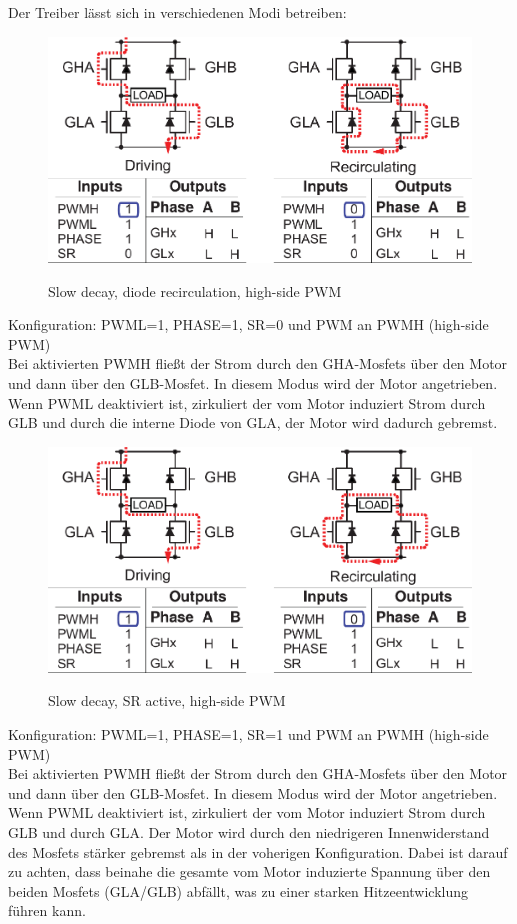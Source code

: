 Der Treiber lässt sich in verschiedenen Modi betreiben:

\begin{figure}[H]
\centering
\includegraphics[width=.8\textwidth]{3941_1.png}\\
\caption{Slow decay, diode recirculation, high-side PWM \cite{ds-A3941}}%
\label{fig:39411}
\end{figure}

Konfiguration: PWML=1, PHASE=1, SR=0 und PWM an PWMH (high-side PWM)\\
Bei aktivierten PWMH fließt der Strom durch den GHA-Mosfets über den Motor und
dann über den GLB-Mosfet. In diesem Modus wird der Motor angetrieben.
Wenn PWML deaktiviert ist, zirkuliert der vom Motor induziert Strom durch GLB und durch
die interne Diode von GLA, der Motor wird dadurch gebremst.


\begin{figure}[H]
\centering
\includegraphics[width=.8\textwidth]{3941_2.png}\\
\caption{Slow decay, SR active, high-side PWM \cite{ds-A3941}}%
\label{fig:39412}
\end{figure}

Konfiguration: PWML=1, PHASE=1, SR=1 und PWM an PWMH (high-side PWM)\\
Bei aktivierten PWMH fließt der Strom durch den GHA-Mosfets über den Motor und
dann über den GLB-Mosfet. In diesem Modus wird der Motor angetrieben.
Wenn PWML deaktiviert ist, zirkuliert der vom Motor induziert Strom durch 
GLB und durch GLA. Der Motor wird durch den niedrigeren Innenwiderstand des Mosfets 
stärker gebremst als in der voherigen Konfiguration. Dabei ist darauf zu achten, dass
beinahe die gesamte vom Motor induzierte Spannung über den beiden Mosfets (GLA/GLB) abfällt,
was zu einer starken Hitzeentwicklung führen kann.



